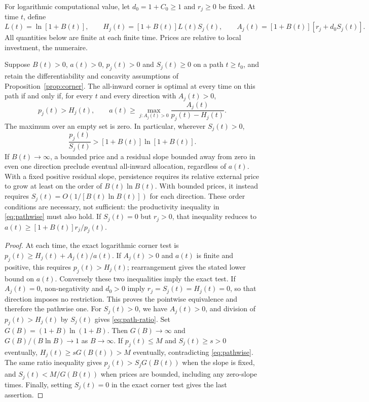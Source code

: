 For logarithmic computational value, let $d_0=1+C_0\geq1$ and
$r_j\geq0$ be fixed. At time $t$, define
\[
 L(t)=\ln[1+B(t)],\qquad
 H_j(t)=[1+B(t)]L(t)S_j(t),\qquad
 A_j(t)=[1+B(t)][r_j+d_0S_j(t)].
\]
All quantities below are finite at each finite time. Prices are relative to
local investment, the numeraire.

\begin{proposition}
\label{prop:persistence}
Suppose $B(t)>0$, $a(t)>0$, $p_j(t)>0$ and $S_j(t)\geq0$ on a
path $t\geq t_0$, and retain the differentiability and concavity assumptions
of Proposition~\ref{prop:corner}. The all-inward corner is optimal at every
time on this path if and only if, for every $t$ and every direction with
$A_j(t)>0$,
\begin{equation}
 p_j(t)>H_j(t),\qquad
 a(t)\geq \max_{j:A_j(t)>0}
 \frac{A_j(t)}{p_j(t)-H_j(t)}.
 \label{eq:pathwise}
\end{equation}
The maximum over an empty set is zero. In particular, wherever $S_j(t)>0$,
\begin{equation}
 \frac{p_j(t)}{S_j(t)}>[1+B(t)]\ln[1+B(t)].
 \label{eq:path-ratio}
\end{equation}
If $B(t)\to\infty$, a bounded price and a residual slope bounded away
from zero in even one direction preclude eventual all-inward allocation,
regardless of $a(t)$. With a fixed positive residual slope, persistence
requires its relative external price to grow at least on the order of
$B(t)\ln B(t)$. With bounded prices, it instead requires
$S_j(t)=O(1/[B(t)\ln B(t)])$ for each direction. These order conditions
are necessary, not sufficient: the productivity inequality in
\eqref{eq:pathwise} must also hold. If $S_j(t)=0$ but $r_j>0$, that
inequality reduces to $a(t)\geq[1+B(t)]r_j/p_j(t)$.
\end{proposition}
\begin{proof}
At each time, the exact logarithmic corner test is
$p_j(t)\geq H_j(t)+A_j(t)/a(t)$. If $A_j(t)>0$ and $a(t)$ is
finite and positive, this requires $p_j(t)>H_j(t)$; rearrangement gives
the stated lower bound on $a(t)$. Conversely these two inequalities imply
the exact test. If $A_j(t)=0$, non-negativity and $d_0>0$ imply
$r_j=S_j(t)=H_j(t)=0$, so that direction imposes no restriction.
This proves the pointwise equivalence and therefore the pathwise one.
For $S_j(t)>0$, we have $A_j(t)>0$, and division of $p_j(t)>H_j(t)$
by $S_j(t)$ gives \eqref{eq:path-ratio}. Set
$G(B)=(1+B)\ln(1+B)$. Then $G(B)\to\infty$ and
$G(B)/(B\ln B)\to1$ as $B\to\infty$. If $p_j(t)\leq M$ and
$S_j(t)\geq s>0$ eventually, $H_j(t)\geq sG(B(t))>M$ eventually,
contradicting \eqref{eq:pathwise}. The same ratio inequality gives
$p_j(t)>S_jG(B(t))$ when the slope is fixed, and
$S_j(t)<M/G(B(t))$ when prices are bounded, including any zero-slope
times. Finally, setting $S_j(t)=0$ in the exact corner test gives the
last assertion.
\end{proof}
